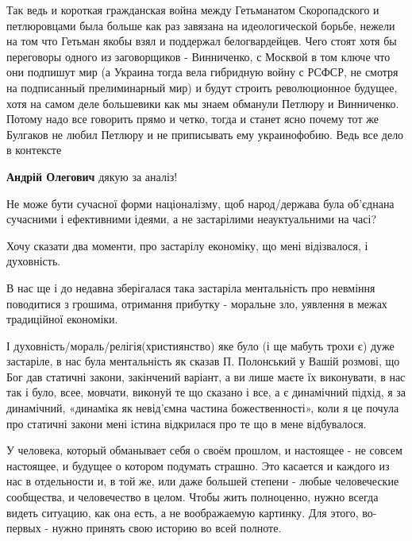 \begin{itemize}

Так ведь и короткая гражданская война между Гетьманатом Скоропадского и
петлюровцами была больше как раз завязана на идеологической борьбе, нежели на
том что Гетьман якобы взял и поддержал белогвардейцев. Чего стоят хотя бы
переговоры одного из заговорщиков - Винниченко, с Москвой в том ключе что они
подпишут мир (а Украина тогда вела гибридную войну с РСФСР, не смотря на
подписанный прелиминарный мир) и будут строить революционное будущее, хотя на
самом деле большевики как мы знаем обманули Петлюру и Винниченко. Потому надо
все говорить прямо и четко, тогда и станет ясно почему тот же Булгаков не любил
Петлюру и не приписывать ему украинофобию. Ведь все дело в контексте


\textbf{Андрій Олегович} дякую за аналіз!

Не може бути сучасної форми націоналізму, щоб народ/держава була об’єднана
сучасними і ефективними ідеями, а не застарілими неауктуальними на часі?

Хочу сказати два моменти, про застарілу економіку, що мені відізвалося, і
духовність.

В нас ще і до недавна зберігалася така застаріла ментальність про невміння
поводитися з грошима, отримання прибутку - моральне зло, уявлення в межах
традиційної економіки.

І духовність/мораль/релігія(християнство) яке було (і ще мабуть трохи є) дуже
застаріле, в нас була ментальність як сказав П. Полонський у Вашій розмові, що
Бог дав статичні закони, закінчений варіант, а ви лише маєте їх виконувати, в
нас так і було, всее, мовчати, виконуй те що сказано і все, а є динамічний
підхід, я за динамічний, «динаміка як невід’ємна частина божественності», коли
я це почула про статичні закони мені істина відкрилася про те що в мене
відбувалося.


У человека, который обманывает себя о своём прошлом, и настоящее - не совсем
настоящее, и будущее о котором подумать страшно. Это касается и каждого из нас
в отдельности и, в той же, или даже большей степени - любые человеческие
сообщества, и человечество в целом. Чтобы жить полноценно, нужно всегда видеть
ситуацию, как она есть, а не воображаемую картинку. Для этого, во-первых -
нужно принять свою историю во всей полноте.




\end{itemize}
